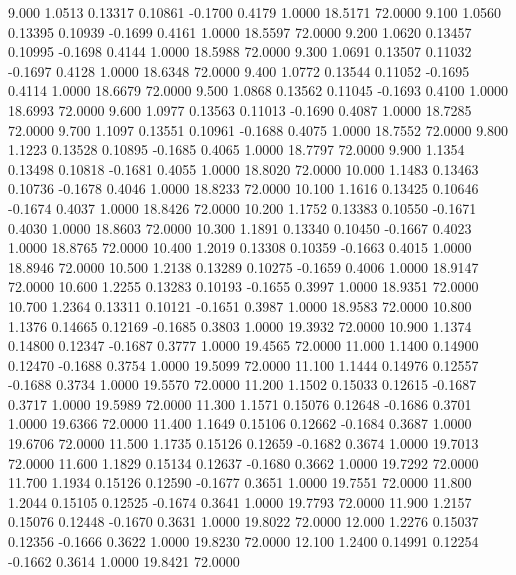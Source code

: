    9.000   1.0513   0.13317   0.10861  -0.1700   0.4179   1.0000  18.5171  72.0000
   9.100   1.0560   0.13395   0.10939  -0.1699   0.4161   1.0000  18.5597  72.0000
   9.200   1.0620   0.13457   0.10995  -0.1698   0.4144   1.0000  18.5988  72.0000
   9.300   1.0691   0.13507   0.11032  -0.1697   0.4128   1.0000  18.6348  72.0000
   9.400   1.0772   0.13544   0.11052  -0.1695   0.4114   1.0000  18.6679  72.0000
   9.500   1.0868   0.13562   0.11045  -0.1693   0.4100   1.0000  18.6993  72.0000
   9.600   1.0977   0.13563   0.11013  -0.1690   0.4087   1.0000  18.7285  72.0000
   9.700   1.1097   0.13551   0.10961  -0.1688   0.4075   1.0000  18.7552  72.0000
   9.800   1.1223   0.13528   0.10895  -0.1685   0.4065   1.0000  18.7797  72.0000
   9.900   1.1354   0.13498   0.10818  -0.1681   0.4055   1.0000  18.8020  72.0000
  10.000   1.1483   0.13463   0.10736  -0.1678   0.4046   1.0000  18.8233  72.0000
  10.100   1.1616   0.13425   0.10646  -0.1674   0.4037   1.0000  18.8426  72.0000
  10.200   1.1752   0.13383   0.10550  -0.1671   0.4030   1.0000  18.8603  72.0000
  10.300   1.1891   0.13340   0.10450  -0.1667   0.4023   1.0000  18.8765  72.0000
  10.400   1.2019   0.13308   0.10359  -0.1663   0.4015   1.0000  18.8946  72.0000
  10.500   1.2138   0.13289   0.10275  -0.1659   0.4006   1.0000  18.9147  72.0000
  10.600   1.2255   0.13283   0.10193  -0.1655   0.3997   1.0000  18.9351  72.0000
  10.700   1.2364   0.13311   0.10121  -0.1651   0.3987   1.0000  18.9583  72.0000
  10.800   1.1376   0.14665   0.12169  -0.1685   0.3803   1.0000  19.3932  72.0000
  10.900   1.1374   0.14800   0.12347  -0.1687   0.3777   1.0000  19.4565  72.0000
  11.000   1.1400   0.14900   0.12470  -0.1688   0.3754   1.0000  19.5099  72.0000
  11.100   1.1444   0.14976   0.12557  -0.1688   0.3734   1.0000  19.5570  72.0000
  11.200   1.1502   0.15033   0.12615  -0.1687   0.3717   1.0000  19.5989  72.0000
  11.300   1.1571   0.15076   0.12648  -0.1686   0.3701   1.0000  19.6366  72.0000
  11.400   1.1649   0.15106   0.12662  -0.1684   0.3687   1.0000  19.6706  72.0000
  11.500   1.1735   0.15126   0.12659  -0.1682   0.3674   1.0000  19.7013  72.0000
  11.600   1.1829   0.15134   0.12637  -0.1680   0.3662   1.0000  19.7292  72.0000
  11.700   1.1934   0.15126   0.12590  -0.1677   0.3651   1.0000  19.7551  72.0000
  11.800   1.2044   0.15105   0.12525  -0.1674   0.3641   1.0000  19.7793  72.0000
  11.900   1.2157   0.15076   0.12448  -0.1670   0.3631   1.0000  19.8022  72.0000
  12.000   1.2276   0.15037   0.12356  -0.1666   0.3622   1.0000  19.8230  72.0000
  12.100   1.2400   0.14991   0.12254  -0.1662   0.3614   1.0000  19.8421  72.0000
